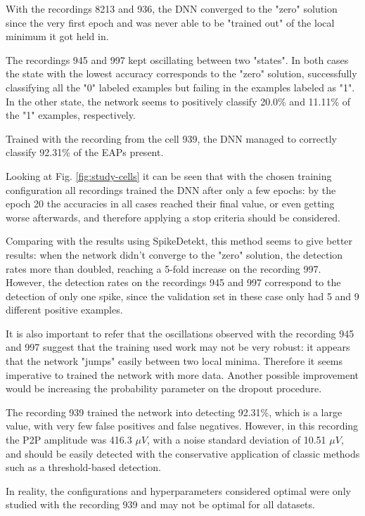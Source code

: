 \documentclass[10pt]{article}
\begin{document}
With the recordings 8213 and 936, the DNN converged to the "zero" solution since the very first epoch and was never able to be "trained out" of the local minimum it got held in.

The recordings 945 and 997 kept oscillating between two "states". In both cases the state with the lowest accuracy corresponds to the "zero" solution, successfully classifying all the "0" labeled examples but failing in the examples labeled as "1". In the other state, the network seems to positively classify 20.0\% and 11.11\% of the "1" examples, respectively.

Trained with the recording from the cell 939, the DNN managed to correctly classify 92.31\% of the EAPs present. 


Looking at Fig. \ref{fig:study-cells} it can be seen that with the chosen training configuration all recordings trained the DNN after only a few epochs: by the epoch 20 the accuracies in all cases reached their final value, or even getting worse afterwards, and therefore applying a stop criteria should be considered.

Comparing with the results using SpikeDetekt, this method seems to give better results: when the network didn't converge to the "zero" solution, the detection rates more than doubled, reaching a 5-fold increase on the recording 997. However, the detection rates on the recordings 945 and 997 correspond to the detection of only one spike, since the validation set in these case only had 5 and 9 different positive examples. 


It is also important to refer that the oscillations observed with the recording 945 and 997 suggest that the training used work may not be very robust: it appears that the network "jumps" easily between two local minima. Therefore it seems imperative to trained the network with more data. Another possible improvement would be increasing the probability parameter on the dropout procedure.


The recording 939 trained the network into detecting 92.31\%, which is a large value, with very few false positives and false negatives. However, in this recording the P2P amplitude was 416.3 $\mu V$, with a noise standard deviation of 10.51 $\mu V$, and should be easily detected with the conservative application of classic methods such as a threshold-based detection.


In reality, the configurations and hyperparameters considered optimal were only studied with the recording 939 and may not be optimal for all datasets.
\end{document}
